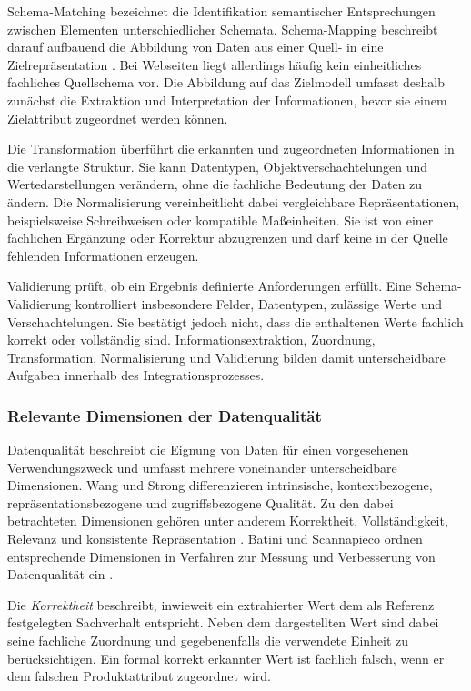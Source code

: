 Schema-Matching bezeichnet die Identifikation semantischer Entsprechungen zwischen Elementen unterschiedlicher Schemata. Schema-Mapping beschreibt darauf 
aufbauend die Abbildung von Daten aus einer Quell- in eine Zielrepräsentation \cite{doan2012principles}. Bei Webseiten liegt allerdings häufig kein einheitliches 
fachliches Quellschema vor. Die Abbildung auf das Zielmodell umfasst deshalb zunächst die Extraktion und Interpretation der Informationen, bevor sie einem 
Zielattribut zugeordnet werden können.

Die Transformation überführt die erkannten und zugeordneten Informationen in die verlangte Struktur. Sie kann Datentypen, Objektverschachtelungen und Wertedarstellungen 
verändern, ohne die fachliche Bedeutung der Daten zu ändern. Die Normalisierung vereinheitlicht dabei vergleichbare Repräsentationen, beispielsweise Schreibweisen 
oder kompatible Maßeinheiten. Sie ist von einer fachlichen Ergänzung oder Korrektur abzugrenzen und darf keine in der Quelle fehlenden Informationen erzeugen.

Validierung prüft, ob ein Ergebnis definierte Anforderungen erfüllt. Eine Schema-Validierung kontrolliert insbesondere Felder, Datentypen, zulässige Werte und 
Verschachtelungen. Sie bestätigt jedoch nicht, dass die enthaltenen Werte fachlich korrekt oder vollständig sind. Informationsextraktion, Zuordnung, Transformation, 
Normalisierung und Validierung bilden damit unterscheidbare Aufgaben innerhalb des Integrationsprozesses.

\subsubsection{Relevante Dimensionen der Datenqualität}

Datenqualität beschreibt die Eignung von Daten für einen vorgesehenen Verwendungszweck und umfasst mehrere voneinander unterscheidbare Dimensionen. Wang und Strong 
differenzieren intrinsische, kontextbezogene, repräsentationsbezogene und zugriffsbezogene Qualität. Zu den dabei betrachteten Dimensionen gehören unter anderem 
Korrektheit, Vollständigkeit, Relevanz und konsistente Repräsentation \cite{wang1996beyond}. Batini und Scannapieco ordnen entsprechende Dimensionen in Verfahren 
zur Messung und Verbesserung von Datenqualität ein \cite{batini2016data}.

Die \emph{Korrektheit} beschreibt, inwieweit ein extrahierter Wert dem als Referenz festgelegten Sachverhalt entspricht. Neben dem dargestellten Wert sind dabei 
seine fachliche Zuordnung und gegebenenfalls die verwendete Einheit zu berücksichtigen. Ein formal korrekt erkannter Wert ist fachlich falsch, wenn er dem falschen 
Produktattribut zugeordnet wird.

